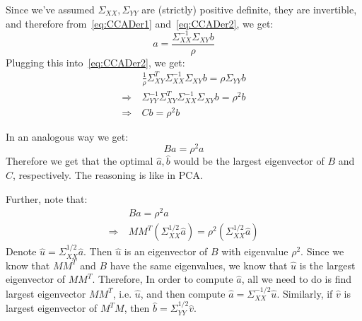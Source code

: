 \documentclass{article}
\begin{document}
Since we've assumed $\Sigma_{XX}, \Sigma_{YY}$ are (strictly) positive definite, they are invertible, and therefore from~\cref{eq:CCADer1} and~\cref{eq:CCADer2}, we get:
\begin{equation}
  a = \frac{\Sigma_{XX} ^{-1} \Sigma_{XY} b}{\rho} 
\end{equation}
Plugging this into~\cref{eq:CCADer2}, we get:
\begin{align*}
  &\frac{1}{\rho} \Sigma_{XY}^{T} \Sigma_{XX} ^{-1}  \Sigma_{XY} b = \rho \Sigma_{YY} b  \\
  \Rightarrow \  & \Sigma_{YY} ^{-1} \Sigma_{XY}^{T} \Sigma_{XX} ^{-1}  \Sigma_{XY} b = \rho ^2 b  \\
  \Rightarrow \ & Cb = \rho ^2 b \label{eq:CCAOptSolC}
\end{align*}

In an analogous way we get:
\begin{equation*} \label{eq:CCAOptSolB}
  Ba = \rho ^2 a  
\end{equation*}
Therefore we get that the optimal $\hat{a}, \hat{b}$ would be the largest eigenvector of $B$ and $C$, respectively. The reasoning is like in PCA. 

Further, note that:
\begin{align} \label{eq:CCAOptSolB}
  & B \hat{a}  = \rho ^2 \hat{a}   \\
   \Rightarrow \ & MM^{T} (\Sigma_{XX}^{1/2} \hat{a} ) = \rho ^2 (\Sigma_{XX}^{1/2} \hat{a}  ) 
\end{align}
Denote $\hat{u} = \Sigma_{XX}^{1/2} \hat{a}$. Then $\hat{u}$ is an eigenvector of $B$ with eigenvalue $\rho ^2$. Since we know that $MM^{T}$ and $B$ have the same eigenvalues, we know that $\hat{u}$ is the largest eigenvector of $MM^{T}$. Therefore, In order to compute $\hat{a}$, all we need to do is find largest eigenvector $MM^{T}$, i.e. $\hat{u}$, and then compute $\hat{a} = \Sigma_{XX}^{-1/2} \hat{u}$. 
Similarly, if $\hat{v}$ is largest eigenvector of $M^{T}M$, then $\hat{b} = \Sigma_{YY}^{1/2} \hat{v}$.
\end{document}
